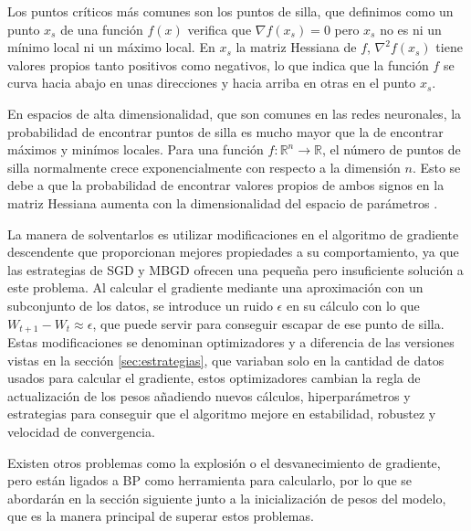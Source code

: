 Los puntos críticos más comunes son los puntos de silla, que definimos como un punto $x_s$ de una función $f(x)$ verifica que $\nabla f(x_s)=0$ pero $x_s$ no es ni un mínimo local ni un máximo local. En $x_s$ la matriz Hessiana de $f$, $\nabla^2 f(x_s)$ tiene valores propios tanto positivos como negativos, lo que indica que la función $f$ se curva hacia abajo en unas direcciones y hacia arriba en otras en el punto $x_s$.

En espacios de alta dimensionalidad, que son comunes en las redes neuronales, la probabilidad de encontrar puntos de silla es mucho mayor que la de encontrar máximos y minímos locales. Para una función $f:\mathbb{R}^n \rightarrow \mathbb{R}$, el número de puntos de silla normalmente crece exponencialmente con respecto a la dimensión $n$. Esto se debe a que la probabilidad de encontrar valores propios de ambos signos en la matriz Hessiana aumenta con la dimensionalidad del espacio de parámetros \cite{dauphin2014SaddlePoints}. 

La manera de solventarlos es utilizar modificaciones en el algoritmo de gradiente descendente que proporcionan mejores propiedades a su comportamiento, ya que las estrategias de SGD y MBGD ofrecen una pequeña pero insuficiente solución a este problema. Al calcular el gradiente mediante una aproximación con un subconjunto de los datos, se introduce un ruido $\epsilon$ en su cálculo con lo que $W_{t+1} - W_t \approx \epsilon$, que puede servir para conseguir escapar de ese punto de silla. Estas modificaciones se denominan optimizadores y a diferencia de las versiones vistas en la sección \ref{sec:estrategias}, que variaban solo en la cantidad de datos usados para calcular el gradiente, estos optimizadores cambian la regla de actualización de los pesos añadiendo nuevos cálculos, hiperparámetros y estrategias para conseguir que el algoritmo mejore en estabilidad, robustez y velocidad de convergencia.


Existen otros problemas como la explosión o el desvanecimiento de gradiente, pero están ligados a BP como herramienta para calcularlo, por lo que se abordarán en la sección siguiente junto a la inicialización de pesos del modelo, que es la manera principal de superar estos problemas.





